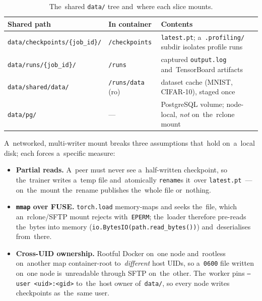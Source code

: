 \begin{table}[H]
\centering\small
\begin{tabularx}{\textwidth}{@{}l l >{\raggedright\arraybackslash}X@{}}
\toprule
\textbf{Shared path} & \textbf{In container} & \textbf{Contents} \\
\midrule
\texttt{data/checkpoints/\{job\_id\}/} & \texttt{/checkpoints}     & \texttt{latest.pt}; a~\texttt{.profiling/} subdir isolates profile runs \\
\texttt{data/runs/\{job\_id\}/}        & \texttt{/runs}           & captured \texttt{output.log} and~TensorBoard artifacts \\
\texttt{data/shared/data/}             & \texttt{/runs/data} (ro) & dataset cache (MNIST, CIFAR-10), staged once \\
\texttt{data/pg/}                      & ---                      & PostgreSQL volume; node-local, \emph{not} on~the~rclone mount \\
\bottomrule
\end{tabularx}
\caption{The~shared \texttt{data/} tree and~where each slice mounts.}\label{tab:shared-fs}
\end{table}

A~networked, multi-writer mount breaks three assumptions that~hold on~a~local
disk; each forces a~specific measure:

\begin{itemize}
  \item \textbf{Partial reads.}  A~peer must never see a~half-written
        checkpoint, so the~trainer writes a~temp file and~atomically
        \texttt{rename}s it~over \texttt{latest.pt}~--- on~the~mount the~rename
        publishes the~whole file or~nothing.
  \item \textbf{\texttt{mmap} over FUSE.}  \texttt{torch.load} memory-maps and
        seeks the~file, which an~rclone/SFTP mount rejects with~\texttt{EPERM};
        the~loader therefore pre-reads the~bytes into memory
        (\texttt{io.BytesIO(path.read\_bytes())}) and~deserialises from~there.
  \item \textbf{Cross-UID ownership.}  Rootful Docker on~one node and~rootless
        on~another map container-root to~\emph{different} host UIDs, so
        a~\texttt{0600} file written on~one node is~unreadable through SFTP
        on~the~other.  The~worker pins \texttt{--user <uid>:<gid>} to~the~host
        owner of~\texttt{data/}, so every node writes checkpoints as~the~same
        user.
\end{itemize}

